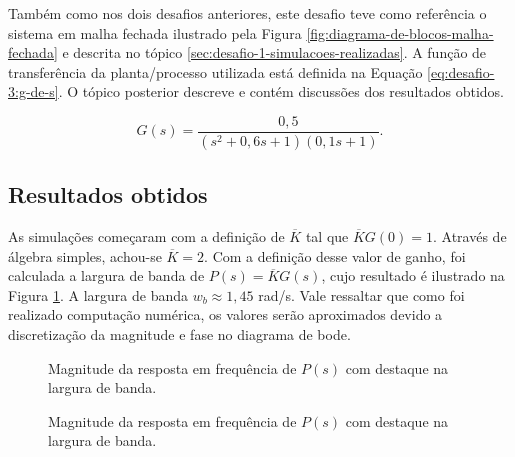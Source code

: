 Também como nos dois desafios anteriores, este desafio teve como referência o
sistema em malha fechada ilustrado pela Figura
\ref{fig:diagrama-de-blocos-malha-fechada} e descrita no tópico
\ref{sec:desafio-1-simulacoes-realizadas}. A função de transferência da
planta/processo utilizada está definida na Equação \ref{eq:desafio-3:g-de-s}. O
tópico posterior descreve e contém discussões dos resultados obtidos.

\begin{equation}
    \label{eq:desafio-3:g-de-s}
    G(s) = \frac{0,5}{(s^2 + 0,6s +1)(0,1s + 1)}.
\end{equation}

\subsection{Resultados obtidos}
As simulações começaram com a definição de $\overline{K}$ tal que
$\overline{K}G(0) = 1$. Através de álgebra simples, achou-se $\overline{K} = 2$.
Com a definição desse valor de ganho, foi calculada a largura de banda de $P(s)
= \overline{K}G(s)$, cujo resultado é ilustrado na Figura
\ref{fig:desafio-3:questao-3}. A largura de banda $w_{b} \approx 1,45$ rad/s.
Vale ressaltar que como foi realizado computação numérica, os valores
serão aproximados devido a discretização da magnitude e fase no diagrama de bode.

\begin{figure}[!ht]
    \caption{Magnitude da resposta em frequência de $P(s)$
    com destaque na largura de banda.}
    \vspace{-10pt}
    \hspace{-30pt}
    \label{fig:desafio-3:questao-3}
    \begin{minipage}{\linewidth}
        
    \end{minipage}
\end{figure}

\begin{figure}[!ht]
    \caption{Magnitude da resposta em frequência de $P(s)$
    com destaque na largura de banda.}
    \vspace{-10pt}
    \hspace{-30pt}
    \label{fig:desafio-3:questao-3-4}
    \begin{minipage}{\linewidth}
        
    \end{minipage}
\end{figure}

